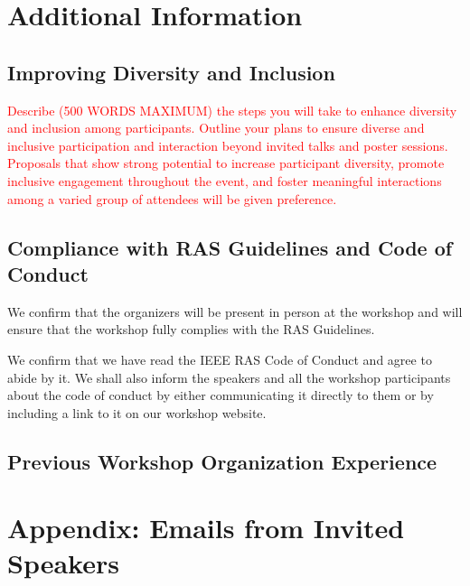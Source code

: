 \documentclass[12pt,a4paper]{article}
\newcommand{\revM}[1]{\textcolor{Red}{#1}}
\begin{document}
\section{Additional Information}
%
\subsection{Improving Diversity and Inclusion}
%
\revM{Describe (500 WORDS MAXIMUM) the steps you will take to enhance diversity and inclusion among participants. Outline your plans to ensure diverse and inclusive participation and interaction beyond invited talks and poster sessions. Proposals that show strong potential to increase participant diversity, promote inclusive engagement throughout the event, and foster meaningful interactions among a varied group of attendees will be given preference.
}
%
\subsection{Compliance with RAS Guidelines and Code of Conduct}
%
We confirm that the organizers will be present in person at the workshop and will ensure that the workshop fully complies with the RAS Guidelines.

We confirm that we have read the IEEE RAS Code of Conduct and agree to abide by it. We shall also inform the speakers and all the workshop participants about the code of conduct by either communicating it directly to them or by including a link to it on our workshop website.
%
\subsection{Previous Workshop Organization Experience}
%
\section{Appendix: Emails from Invited Speakers} \label{sec_appendix}
%
\end{document}
